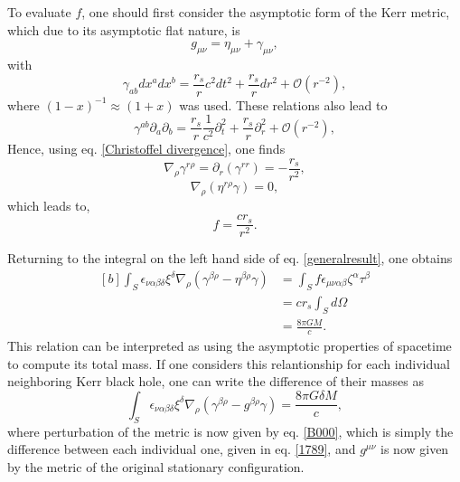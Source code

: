 \documentclass[
12pt,		%
openright,	%
twoside,  %
a4paper,			%
chapter=TITLE,		%
english,			%
french,				%
spanish,			%
brazil				%
]{USPSC-classe/USPSC}
\begin{document}
\begin{apendicesenv}
To evaluate $f$, one should first consider the asymptotic form of the Kerr metric, which due to its asymptotic flat nature, is
\begin{equation}\label{1789}
    g_{\mu\nu}=\eta_{\mu\nu}+\gamma_{\mu\nu},
\end{equation}
with 
\begin{equation}
    \gamma_{ab}dx^adx^b=\frac{r_s}{r}c^2dt^2+\frac{r_s}{r}dr^2+\mathcal{O}(r^{-2}),
\end{equation}
where $(1-x)^{-1}\approx (1+x)$ was used. These relations also lead to
\begin{equation}
    \gamma^{ab}\partial_a\partial_b=\frac{r_s}{r}\frac{1}{c^2}\partial_t^2+\frac{r_s}{r}\partial_r^2+\mathcal{O}(r^{-2}),
\end{equation}
Hence, using eq. \ref{Christoffel divergence}, one finds
\begin{equation}
    \nabla_{\rho}\gamma^{r\rho}=\partial_r(\gamma^{rr})=-\frac{r_s}{r^2},
\end{equation}
\begin{equation}
    \nabla_{\rho}(\eta^{r\rho}\gamma)=0,
\end{equation}
which leads to,
\begin{equation}
    f=\frac{cr_s}{r^2}.
\end{equation}

Returning to the integral on the left hand side of eq. \ref{generalresult}, one obtains
\begin{equation}
\begin{aligned}[b]
\int_S\epsilon_{\nu\alpha\beta\delta}\xi^{\delta}\nabla_{\rho}(\gamma^{\beta\rho}-\eta^{\beta\rho}\gamma) &= \int_Sf\epsilon_{\mu\nu\alpha\beta}\zeta^{\alpha}\tau^{\beta}\\
 &=cr_s\int_Sd\Omega\\
 &=\frac{8\pi G M}{c}.
\end{aligned}    
\end{equation}
This relation can be interpreted as using the asymptotic properties of spacetime to compute its total mass. If one considers this relantionship for each individual neighboring Kerr black hole, one can write the difference of their masses as
\begin{equation}\label{admmass}
    \int_S\epsilon_{\nu\alpha\beta\delta}\xi^{\delta}\nabla_{\rho}(\gamma^{\beta\rho}-g^{\beta\rho}\gamma) =\frac{8\pi G \delta  M}{c},
\end{equation}
where perturbation of the metric is now given by eq. \ref{B000}, which is simply the difference between each individual one, given in eq. \ref{1789}, and $g^{\mu\nu}$ is now given by the metric of the original stationary configuration.


\end{apendicesenv}
\end{document}
